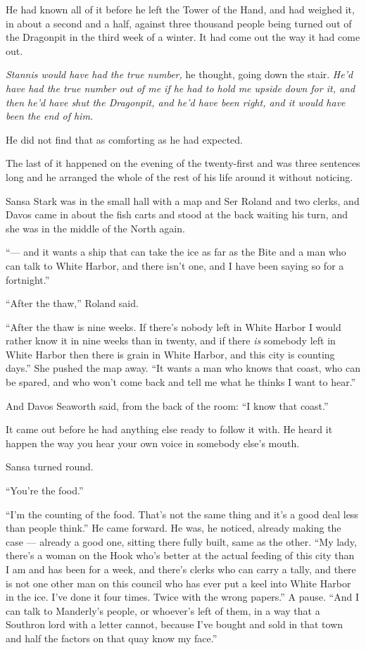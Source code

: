 He had known all of it before he left the Tower of the Hand, and had weighed it, in about a second and a half, against three thousand people being turned out of the Dragonpit in the third week of a winter. It had come out the way it had come out.

\textit{Stannis would have had the true number,} he thought, going down the stair. \textit{He’d have had the true number out of me if he had to hold me upside down for it, and then he’d have shut the Dragonpit, and he’d have been right, and it would have been the end of him.}

He did not find that as comforting as he had expected.

\sceneBreak

The last of it happened on the evening of the twenty-first and was three sentences long and he arranged the whole of the rest of his life around it without noticing.

Sansa Stark was in the small hall with a map and Ser Roland and two clerks, and Davos came in about the fish carts and stood at the back waiting his turn, and she was in the middle of the North again.

“— and it wants a ship that can take the ice as far as the Bite and a man who can talk to White Harbor, and there isn’t one, and I have been saying so for a fortnight.”

“After the thaw,” Roland said.

“After the thaw is nine weeks. If there’s nobody left in White Harbor I would rather know it in nine weeks than in twenty, and if there \textit{is} somebody left in White Harbor then there is grain in White Harbor, and this city is counting days.” She pushed the map away. “It wants a man who knows that coast, who can be spared, and who won’t come back and tell me what he thinks I want to hear.”

And Davos Seaworth said, from the back of the room: “I know that coast.”

It came out before he had anything else ready to follow it with. He heard it happen the way you hear your own voice in somebody else’s mouth.

Sansa turned round.

“You’re the food.”

“I’m the counting of the food. That’s not the same thing and it’s a good deal less than people think.” He came forward. He was, he noticed, already making the case — already a good one, sitting there fully built, same as the other. “My lady, there’s a woman on the Hook who’s better at the actual feeding of this city than I am and has been for a week, and there’s clerks who can carry a tally, and there is not one other man on this council who has ever put a keel into White Harbor in the ice. I’ve done it four times. Twice with the wrong papers.” A pause. “And I can talk to Manderly’s people, or whoever’s left of them, in a way that a Southron lord with a letter cannot, because I’ve bought and sold in that town and half the factors on that quay know my face.”

